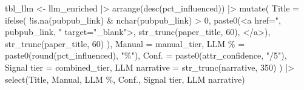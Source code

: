 \documentclass[
  11pt,
  letterpaper,
]{article}
\newenvironment{Shaded}{\begin{snugshade}}{\end{snugshade}}
\newcommand{\AttributeTok}[1]{\textcolor[rgb]{0.40,0.45,0.13}{#1}}
\newcommand{\DecValTok}[1]{\textcolor[rgb]{0.68,0.00,0.00}{#1}}
\newcommand{\FunctionTok}[1]{\textcolor[rgb]{0.28,0.35,0.67}{#1}}
\newcommand{\NormalTok}[1]{\textcolor[rgb]{0.00,0.23,0.31}{#1}}
\newcommand{\OtherTok}[1]{\textcolor[rgb]{0.00,0.23,0.31}{#1}}
\newcommand{\SpecialCharTok}[1]{\textcolor[rgb]{0.37,0.37,0.37}{#1}}
\newcommand{\StringTok}[1]{\textcolor[rgb]{0.13,0.47,0.30}{#1}}
\begin{document}
\begin{table}
\begin{Shaded}
\begin{Highlighting}[]
\NormalTok{  tbl\_llm }\OtherTok{\textless{}{-}}\NormalTok{ llm\_enriched }\SpecialCharTok{|\textgreater{}}
    \FunctionTok{arrange}\NormalTok{(}\FunctionTok{desc}\NormalTok{(pct\_influenced)) }\SpecialCharTok{|\textgreater{}}
    \FunctionTok{mutate}\NormalTok{(}
      \AttributeTok{Title =} \FunctionTok{ifelse}\NormalTok{(}
        \SpecialCharTok{!}\FunctionTok{is.na}\NormalTok{(pubpub\_link) }\SpecialCharTok{\&} \FunctionTok{nchar}\NormalTok{(pubpub\_link) }\SpecialCharTok{\textgreater{}} \DecValTok{0}\NormalTok{,}
        \FunctionTok{paste0}\NormalTok{(}\StringTok{\textquotesingle{}\textless{}a href="\textquotesingle{}}\NormalTok{, pubpub\_link, }\StringTok{\textquotesingle{}" target="\_blank"\textgreater{}\textquotesingle{}}\NormalTok{,}
               \FunctionTok{str\_trunc}\NormalTok{(paper\_title, }\DecValTok{60}\NormalTok{), }\StringTok{\textquotesingle{}\textless{}/a\textgreater{}\textquotesingle{}}\NormalTok{),}
        \FunctionTok{str\_trunc}\NormalTok{(paper\_title, }\DecValTok{60}\NormalTok{)}
\NormalTok{      ),}
      \StringTok{\textasciigrave{}}\AttributeTok{Manual}\StringTok{\textasciigrave{}}      \OtherTok{=}\NormalTok{ manual\_tier,}
      \StringTok{\textasciigrave{}}\AttributeTok{LLM \%}\StringTok{\textasciigrave{}}       \OtherTok{=} \FunctionTok{paste0}\NormalTok{(}\FunctionTok{round}\NormalTok{(pct\_influenced), }\StringTok{"\%"}\NormalTok{),}
      \StringTok{\textasciigrave{}}\AttributeTok{Conf.}\StringTok{\textasciigrave{}}       \OtherTok{=} \FunctionTok{paste0}\NormalTok{(attr\_confidence, }\StringTok{"/5"}\NormalTok{),}
      \StringTok{\textasciigrave{}}\AttributeTok{Signal tier}\StringTok{\textasciigrave{}} \OtherTok{=}\NormalTok{ combined\_tier,}
      \StringTok{\textasciigrave{}}\AttributeTok{LLM narrative}\StringTok{\textasciigrave{}} \OtherTok{=} \FunctionTok{str\_trunc}\NormalTok{(narrative, }\DecValTok{350}\NormalTok{)}
\NormalTok{    ) }\SpecialCharTok{|\textgreater{}}
    \FunctionTok{select}\NormalTok{(Title, Manual, }\StringTok{\textasciigrave{}}\AttributeTok{LLM \%}\StringTok{\textasciigrave{}}\NormalTok{, Conf., }\StringTok{\textasciigrave{}}\AttributeTok{Signal tier}\StringTok{\textasciigrave{}}\NormalTok{, }\StringTok{\textasciigrave{}}\AttributeTok{LLM narrative}\StringTok{\textasciigrave{}}\NormalTok{)}


\end{Highlighting}
\end{Shaded}
\end{table}
\end{document}

